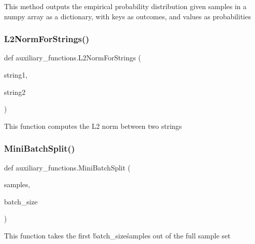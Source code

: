 \begin{DoxyVerb}This method outputs the empirical probability distribution given samples in a numpy array
as a dictionary, with keys as outcomes, and values as probabilities\end{DoxyVerb}
 \mbox{\label{namespaceauxiliary__functions_a6c2ed3da4759f13ac407997c85313b31}} 
\subsubsection{\texorpdfstring{L2\+Norm\+For\+Strings()}{L2NormForStrings()}}
{\footnotesize\ttfamily def auxiliary\+\_\+functions.\+L2\+Norm\+For\+Strings (\begin{DoxyParamCaption}\item[{}]{string1,  }\item[{}]{string2 }\end{DoxyParamCaption})}

\begin{DoxyVerb}This function computes the L2 norm between two strings\end{DoxyVerb}
 \mbox{\label{namespaceauxiliary__functions_afdaed4d363ed08c291ca6b32bbc2ea77}} 
\subsubsection{\texorpdfstring{Mini\+Batch\+Split()}{MiniBatchSplit()}}
{\footnotesize\ttfamily def auxiliary\+\_\+functions.\+Mini\+Batch\+Split (\begin{DoxyParamCaption}\item[{}]{samples,  }\item[{}]{batch\+\_\+size }\end{DoxyParamCaption})}

\begin{DoxyVerb}This function takes the first \'batch_size\' samples out of the full sample set \end{DoxyVerb}
 \mbox{\label{namespaceauxiliary__functions_a9338b2da58eea385c1e9d9d1f956867d}} 
